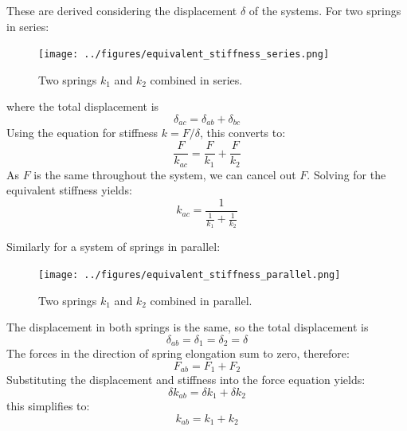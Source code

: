 \documentclass[12pt,letter]{article}
\begin{document}
			\pagebreak
			\noindent These are derived considering the displacement $\delta$ of the systems. For two springs in series:
			\begin{figure}[H]
				\centering
				\texttt{[image: ../figures/equivalent\_stiffness\_series.png]}
				\caption{Two springs $k_1$ and $k_2$ combined in series.}
			\end{figure}			
			\noindent where the total displacement is 
			\begin{equation}
				\delta_{ac} = \delta_{ab} + \delta_{bc}
			\end{equation}
			Using the equation for stiffness $k=F/\delta$, this converts to:
			\begin{equation}
				\frac{F}{k_{ac}} = \frac{F}{k_{1}} + \frac{F}{k_{2}}
			\end{equation}
			As $F$ is the same throughout the system, we can cancel out $F$. Solving for the equivalent stiffness yields:
			\begin{equation}
				k_{ac} = \frac{1}{\frac{1}{k_1}+\frac{1}{k_2}}
			\end{equation}
		
			Similarly for a system of springs in parallel:
			\begin{figure}[H]
				\centering
				\texttt{[image: ../figures/equivalent\_stiffness\_parallel.png]}
				\caption{Two springs $k_1$ and $k_2$ combined in parallel.}				
			\end{figure}			
			\noindent The displacement in both springs is the same, so the total displacement is 
			\begin{equation}
				\delta_{ab} = \delta_{\text{1}} =  \delta_{\text{2}} = \delta
			\end{equation}
			The forces in the direction of spring elongation sum to zero, therefore:
			\begin{equation}
				F_{ab} = F_{\text{1}} +  F_{\text{2}}
			\end{equation}			
			Substituting the displacement and stiffness into the force equation yields:
			\begin{equation}
				\delta k_{ab} = 	\delta k_{1} +  \delta k_{2}
			\end{equation}				
			this simplifies to:
			\begin{equation}
				k_{ab} = k_1+k_2
			\end{equation}
			
\end{document}
